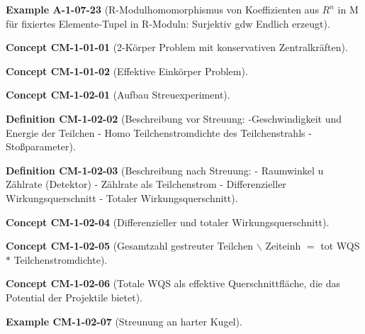 \documentclass[10pt, letterpaper]{article}
\newcommand{\CustomHeading}[3]{%
  \par\medskip\noindent%
  \textbf{#1 #2} \textnormal{(#3)}.\enskip%
}
\newenvironment{DEF}[2]{\CustomHeading{Definition}{#1}{#2}}{}
\newenvironment{EXA}[2]{\CustomHeading{Example}{#1}{#2}}{}
\newenvironment{CONC}[2]{\CustomHeading{Concept}{#1}{#2}}{}
\begin{document}
\begin{EXA}{A-1-07-23}{R-Modulhomomorphismus von Koeffizienten aus $R^n$ in M für fixiertes Elemente-Tupel in R-Moduln: Surjektiv gdw Endlich erzeugt}
\end{EXA}

\begin{CONC}{CM-1-01-01}{2-Körper Problem mit konservativen Zentralkräften}
\end{CONC}

\begin{CONC}{CM-1-01-02}{Effektive Einkörper Problem}
\end{CONC}

\begin{CONC}{CM-1-02-01}{Aufbau Streuexperiment}
\end{CONC}

\begin{DEF}{CM-1-02-02}{Beschreibung vor Streuung:
-Geschwindigkeit und Energie der Teilchen
- Homo Teilchenstromdichte des Teilchenstrahls
- Stoßparameter}
\end{DEF}

\begin{DEF}{CM-1-02-03}{Beschreibung nach Streuung:
- Raumwinkel u Zählrate (Detektor)
- Zählrate als Teilchenstrom
- Differenzieller Wirkungsquerschnitt
- Totaler Wirkungsquerschnitt}
\end{DEF}

\begin{CONC}{CM-1-02-04}{Differenzieller und totaler Wirkungsquerschnitt}
\end{CONC}

\begin{CONC}{CM-1-02-05}{Gesamtzahl gestreuter Teilchen $\backslash$ Zeiteinh $=$ tot WQS $*$ Teilchenstromdichte}
\end{CONC}

\begin{CONC}{CM-1-02-06}{Totale WQS als effektive Querschnittfläche, die das Potential der Projektile bietet}
\end{CONC}

\begin{EXA}{CM-1-02-07}{Streunung an harter Kugel}
\end{EXA}
\end{document}
